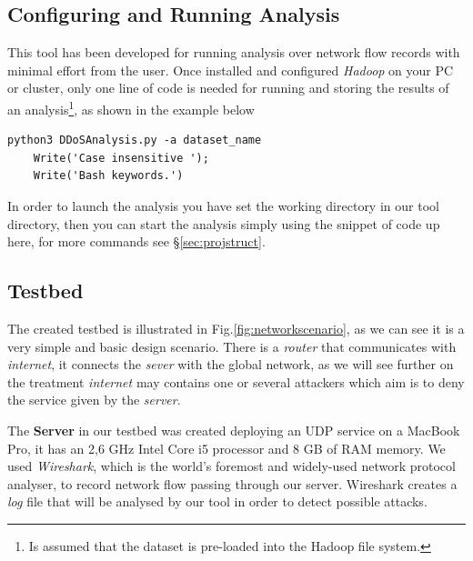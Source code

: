 \subsection{Configuring and Running Analysis}
This tool has been developed for running analysis over network flow records with minimal effort from the user. Once installed and configured \textit{Hadoop} on your PC or cluster, only one line of code is needed for running and storing the results of an analysis\footnote{Is assumed that the dataset is pre-loaded into the Hadoop file system.}, as shown in the example below

\begin{lstlisting}[firstline=1, lastline=1, label={lst:start}]
   python3 DDoSAnalysis.py -a dataset_name
	Write('Case insensitive '); 
	Write('Bash keywords.')
\end{lstlisting}

In order to launch the analysis you have set the working directory  in our tool directory, then you can start the analysis simply using the snippet of code up here, for more commands see \S \ref{sec:projstruct}. 

\subsection{Testbed} 
The created testbed is illustrated in Fig.\ref{fig:networkscenario}, as we can see it is a very simple and basic design scenario. There is a \textit{router} that communicates with \textit{internet},  it connects the \textit{sever} with the global network, as we will see further on the treatment \textit{internet} may contains one or several attackers which aim is to deny the service given by the \textit{server}. 

The \textbf{Server} in our testbed was created deploying an UDP service on a MacBook Pro, it has an 2,6 GHz Intel Core i5 processor and 8 GB of RAM memory. 
We used \textit{Wireshark}, which is the world's foremost and widely-used network protocol analyser, to record network flow passing through our server. 
Wireshark creates a \textit{log} file that will be analysed by our tool in order to detect possible attacks.

